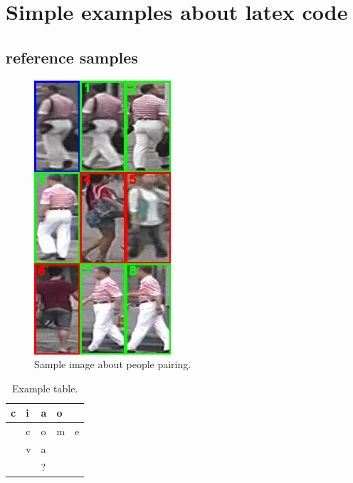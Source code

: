 \chapter*{Simple examples about latex code}
\label{cha:samples}

\section{reference samples}
\label{sec:refSamples}

\begin{figure}[!h]
	\centering
	\includegraphics[]{images/peoplePairing.jpg}
	\caption{Sample image about people pairing.}
	\label{fig:peoplePair}
\end{figure}

\begin{table}[h]
	\centering
	\begin{tabular}{ll|l|ll}
		\cline{1-4}
		\multicolumn{1}{|l|}{c} & i & a & \multicolumn{1}{l|}{o} &                        \\ \hline
		\multicolumn{1}{l|}{}   & c & o & \multicolumn{1}{l|}{m} & \multicolumn{1}{l|}{e} \\ \cline{2-5} 
		\multicolumn{1}{l|}{}   & v & a &                        &                        \\ \cline{2-3}
		&   & ? &                        &                        \\ \cline{3-3}
	\end{tabular}
	\caption{Example table.}
	\label{tab:sampleTable}
\end{table}

